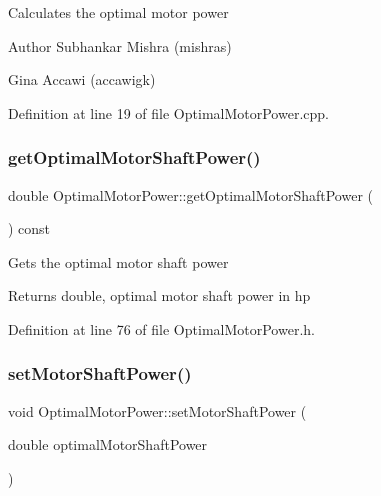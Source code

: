 Calculates the optimal motor power

\begin{DoxyAuthor}{Author}
Subhankar Mishra (mishras) 

Gina Accawi (accawigk) 
\end{DoxyAuthor}


Definition at line 19 of file Optimal\+Motor\+Power.\+cpp.

\mbox{\label{class_optimal_motor_power_a7d6e976abf406c54637d3b51e098d7c8}} 
\subsubsection{\texorpdfstring{get\+Optimal\+Motor\+Shaft\+Power()}{getOptimalMotorShaftPower()}}
{\footnotesize\ttfamily double Optimal\+Motor\+Power\+::get\+Optimal\+Motor\+Shaft\+Power (\begin{DoxyParamCaption}{ }\end{DoxyParamCaption}) const\hspace{0.3cm}{\ttfamily [inline]}}

Gets the optimal motor shaft power \begin{DoxyReturn}{Returns}
double, optimal motor shaft power in hp 
\end{DoxyReturn}


Definition at line 76 of file Optimal\+Motor\+Power.\+h.

\mbox{\label{class_optimal_motor_power_ada8a9e3caac34c54470ad13ffe7edf53}} 
\subsubsection{\texorpdfstring{set\+Motor\+Shaft\+Power()}{setMotorShaftPower()}}
{\footnotesize\ttfamily void Optimal\+Motor\+Power\+::set\+Motor\+Shaft\+Power (\begin{DoxyParamCaption}\item[{double}]{optimal\+Motor\+Shaft\+Power }\end{DoxyParamCaption})\hspace{0.3cm}{\ttfamily [inline]}}

